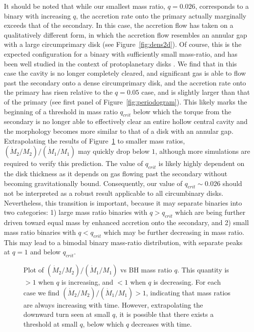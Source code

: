 \documentclass[apj]{emulateapj}
\begin{document}
It should be noted that while our smallest mass ratio, $q=0.026$, corresponds to a binary with increasing $q$, the accretion rate onto the primary actually marginally exceeds that of the secondary. In this case, the accretion flow has taken on a qualitatively different form, in which the accretion flow resembles an annular gap with a large circumprimary disk (see Figure~\ref{fig:dens2d}). Of course, this is the expected configuration for a binary with sufficiently small mass-ratio, and has been well studied in the context of protoplanetary disks \citep{lin93}. We find that in this case the cavity is no longer completely cleared, and significant gas is able to flow past the secondary onto a dense circumprimary disk, and the accretion rate onto the primary has risen relative to the $q=0.05$ case, and is slightly larger than that of the primary (see first panel of Figure~\ref{fig:periodogram}). This likely marks the beginning of a threshold in mass ratio $q_{crit}$ below which the torque from the secondary is no longer able to effectively clear an entire hollow central cavity and the morphology becomes more similar to that of a disk with an annular gap. Extrapolating the results of Figure~\ref{fig:mdot_ratio} to smaller mass ratios, $(\dot{M}_2 / M_2)/(\dot{M}_1 / M_1)$ may quickly drop below $1$, although more simulations are required to verify this prediction.
The value of $q_{crit}$ is likely highly dependent on the disk thickness as it depends on gas flowing past the secondary without becoming gravitationally bound. Consequently, our value of $q_{crit}\sim0.026$ should not be interpreted as a robust result applicable to all circumbinary disks. Nevertheless, this transition is important, because it may separate binaries into two categories: 1) large mass ratio binaries with $q>q_{crit}$ which are being further driven toward equal mass by enhanced accretion onto the secondary, and 2) small mass ratio binaries with $q<q_{crit}$ which may be further decreasing in mass ratio. This may lead to a bimodal binary mass-ratio distribution, with separate peaks at $q=1$ and below $q_{crit}$.
\begin{figure}
\caption{Plot of $(\dot{M}_2/M_2)/(\dot{M}_1/M_1)$ vs BH mass ratio $q$. This quantity is $>1$ when $q$ is increasing, and $<1$ when $q$ is decreasing. For each case we find $(\dot{M}_2/M_2)/(\dot{M}_1/M_1) > 1$, indicating that mass ratios are always increasing with time. However, extrapolating the downward turn seen at small $q$, it is possible that there exists a threshold at small $q$, below which $q$ decreases with time.}
\label{fig:mdot_ratio}
\end{figure}
\end{document}
